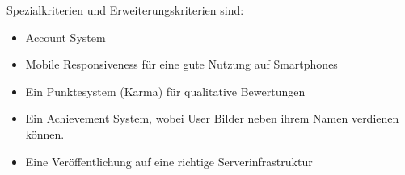 Spezialkriterien und Erweiterungskriterien sind:
\begin{itemize}
    \item Account System
    \item Mobile Responsiveness für eine gute Nutzung auf Smartphones
    \item Ein Punktesystem (Karma) für qualitative Bewertungen
    \item Ein Achievement System, wobei User Bilder neben ihrem Namen verdienen können.
    \item Eine Veröffentlichung auf eine richtige Serverinfrastruktur
\end{itemize}
